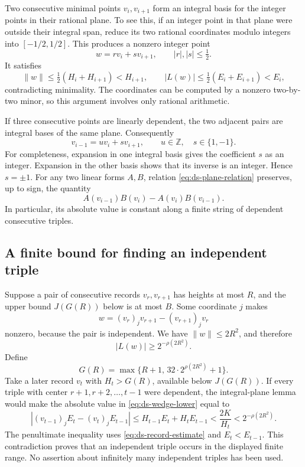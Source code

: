 Two consecutive minimal points $v_i,v_{i+1}$ form an integral basis for
the integer points in their rational plane.  To see this, if an integer
point in that plane were outside their integral span, reduce its two
rational coordinates modulo integers into $[-1/2,1/2]$.  This produces
a nonzero integer point
\[
 w=r v_i+s v_{i+1},\qquad |r|,|s|\leq\tfrac12.
\]
It satisfies
\[
 \|w\|\leq\tfrac12(H_i+H_{i+1})<H_{i+1},\qquad
 |L(w)|\leq\tfrac12(E_i+E_{i+1})<E_i,
\]
contradicting minimality.  The coordinates can be computed by a nonzero
two-by-two minor, so this argument involves only rational arithmetic.

If three consecutive points are linearly dependent, the two adjacent
pairs are integral bases of the same plane.  Consequently
\begin{equation}\label{eq:ds-plane-relation}
 v_{i-1}=u v_i+s v_{i+1},\qquad u\in\mathbb Z,\quad s\in\{1,-1\}.
\end{equation}
For completeness, expansion in one integral basis gives the coefficient
$s$ as an integer.  Expansion in the other basis shows that its inverse
is an integer.  Hence $s=\pm1$.
For any two linear forms $A,B$, relation
\eqref{eq:ds-plane-relation} preserves, up to sign, the quantity
\[
 A(v_{i-1})B(v_i)-A(v_i)B(v_{i-1}).
\]
In particular, its absolute value is constant along a finite string of
dependent consecutive triples.

\subsection{A finite bound for finding an independent triple}

Suppose a pair of consecutive records $v_r,v_{r+1}$ has heights at most
$R$, and the upper bound $J(G(R))$ below is at most $B$.  Some coordinate $j$ makes
\[
 w=(v_r)_j v_{r+1}-(v_{r+1})_j v_r
\]
nonzero, because the pair is independent.  We have $\|w\|\leq2R^2$, and
therefore
\begin{equation}\label{eq:ds-wedge-lower}
 |L(w)|\geq2^{-\rho(2R^2)}.
\end{equation}
Define
\begin{equation}\label{eq:ds-gap}
 G(R)=\max\{R+1,\,32\cdot2^{\rho(2R^2)}+1\}.
\end{equation}
Take a later record $v_t$ with $H_t>G(R)$, available below $J(G(R))$.
If every triple with center $r+1,r+2,\ldots,t-1$ were dependent, the
integral-plane lemma would make the absolute value in
\eqref{eq:ds-wedge-lower} equal to
\[
 |(v_{t-1})_jE_t-(v_t)_jE_{t-1}|
 \leq H_{t-1}E_t+H_tE_{t-1}
 <\frac{2K}{H_t}
 <2^{-\rho(2R^2)}.
\]
The penultimate inequality uses \eqref{eq:ds-record-estimate} and
$E_t<E_{t-1}$.  This contradiction proves that an independent triple
occurs in the displayed finite range.  No assertion about infinitely many
independent triples has been used.

